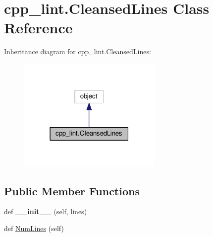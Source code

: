 \hypertarget{classcpp__lint_1_1_cleansed_lines}{}\section{cpp\+\_\+lint.\+Cleansed\+Lines Class Reference}
\label{classcpp__lint_1_1_cleansed_lines}


Inheritance diagram for cpp\+\_\+lint.\+Cleansed\+Lines\+:
\nopagebreak
\begin{figure}[H]
\begin{center}
\leavevmode
\includegraphics[width=198pt]{classcpp__lint_1_1_cleansed_lines__inherit__graph}
\end{center}
\end{figure}
\subsection*{Public Member Functions}
\begin{DoxyCompactItemize}
\item 
\mbox{\label{classcpp__lint_1_1_cleansed_lines_adb5946fb07a3b5f483a9b80ab11e3684}} 
def {\bfseries \+\_\+\+\_\+init\+\_\+\+\_\+} (self, lines)
\item 
def \mbox{\hyperlink{classcpp__lint_1_1_cleansed_lines_a52145364f0dac8c4aa2c0b807abb44ee}{Num\+Lines}} (self)
\end{DoxyCompactItemize}

